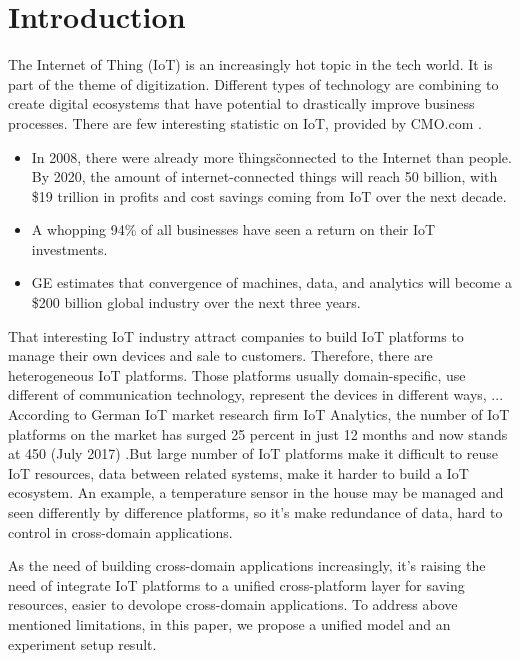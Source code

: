 \documentclass[runningheads,a4paper]{llncs}
\begin{document}
\newpage

\section{Introduction}


\hspace*{0.5cm} The Internet of Thing (IoT) is an increasingly hot topic in the tech world. It is part of the theme of digitization. Different types of technology are combining to create digital ecosystems that have potential to drastically improve business processes. There are few interesting statistic on IoT, provided by CMO.com \cite{CMO.com}.

\begin{itemize}
\item In 2008, there were already more \"things\" connected to the Internet than people. By 
2020, the amount of internet-connected things will reach 50 billion, with \$19 trillion in profits and cost savings coming from IoT over the next decade.
\item A whopping 94\% of all businesses have seen a return on their IoT investments.
\item GE estimates that convergence of machines, data, and analytics will become a \$200 billion global industry over the next three years.
\end{itemize}


That interesting IoT industry attract companies to build IoT platforms to manage their own devices and sale to customers. Therefore, there are heterogeneous IoT platforms. Those platforms usually domain-specific, use different of communication technology, represent the devices in different ways, ... According to German IoT market research firm IoT Analytics, the number of IoT platforms on the market has surged 25 percent in just 12 months and now stands at 450 (July 2017) \cite{numberofplatform}.But large number of IoT platforms make it difficult to reuse IoT resources, data between related systems, make it harder to build a IoT ecosystem. An example, a temperature sensor in the house may be managed and seen differently by difference platforms, so it's make redundance of data, hard to control in cross-domain applications. 

\hspace{0.5cm} As the need of building cross-domain applications increasingly, it's raising the need of integrate IoT platforms to a unified cross-platform layer for saving resources, easier to devolope cross-domain applications. To address above mentioned limitations, in this paper, we propose a unified model and an experiment setup result.
\end{document}
